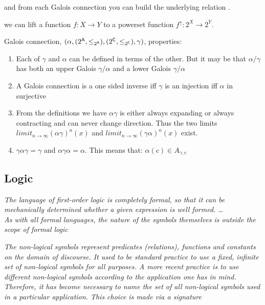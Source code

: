 and from each Galois connection you can build the underlying relation \cite{}.





\vspace*{5mm}{\bf Notation:} we can lift a function $f:X\rightarrow Y$ to a powerset function  $f^{\uparrow}:2^X\rightarrow 2^Y$.

Galois connection, $( \alpha, (2^{\sf A},\leq_{2^{\sf A}}), (2^{\sf C},  \leq_{2^{\sf C}}),\gamma)$,  properties:
\begin{enumerate}
\item Each of $\gamma$ and  $\alpha$ can be defined in terms of the other. But it may be that $\alpha/\gamma$ has  both an upper Galois $\gamma/\alpha$ and a lower Galois $\gamma/\alpha$
\item A Galois connection is a one sided inverse iff $\gamma$ is an injection iff $\alpha$ in surjective
\item From the definitions we have  $\alpha \gamma$ is either always expanding or always contracting and can never change direction. Thus the two limits  $limit_{n\rightarrow\infty} (\alpha \gamma)^n (x)$ and $limit_{n\rightarrow\infty} (\gamma\alpha)^n (x)$ exist.

\item $\gamma \alpha \gamma = \gamma$ and  $\alpha \gamma \alpha = \alpha$. This means that: $\alpha(c) \in A_{\gamma,c}$  
\end{enumerate}

\subsection{Logic}
\emph{The language of first-order logic is completely formal, so that it can be mechanically determined whether a given expression is well formed.  \ldots \\
As with all formal languages, the nature of the symbols themselves is outside the scope of formal logic}


\emph {The non-logical symbols represent predicates (relations), functions and constants on the domain of discourse. It used to be standard practice to use a fixed, infinite set of non-logical symbols for all purposes. A more recent practice is to use different non-logical symbols according to the application one has in mind. Therefore, it has become necessary to name the set of all non-logical symbols used in a particular application. This choice is made via a signature}

